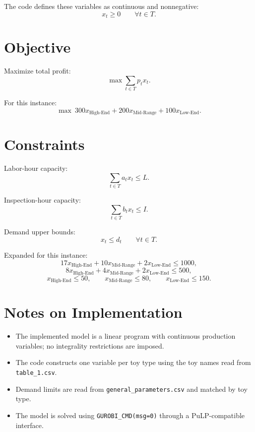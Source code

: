 The code defines these variables as continuous and nonnegative:
\[
x_t \ge 0 \qquad \forall t \in T.
\]

\section*{Objective}

Maximize total profit:
\[
\max \sum_{t \in T} p_t x_t.
\]

For this instance:
\[
\max\ 300x_{\text{High-End}} + 200x_{\text{Mid-Range}} + 100x_{\text{Low-End}}.
\]

\section*{Constraints}

Labor-hour capacity:
\[
\sum_{t \in T} a_t x_t \le L.
\]

Inspection-hour capacity:
\[
\sum_{t \in T} b_t x_t \le I.
\]

Demand upper bounds:
\[
x_t \le d_t \qquad \forall t \in T.
\]

Expanded for this instance:
\[
17x_{\text{High-End}} + 10x_{\text{Mid-Range}} + 2x_{\text{Low-End}} \le 1000,
\]
\[
8x_{\text{High-End}} + 4x_{\text{Mid-Range}} + 2x_{\text{Low-End}} \le 500,
\]
\[
x_{\text{High-End}} \le 50,\qquad
x_{\text{Mid-Range}} \le 80,\qquad
x_{\text{Low-End}} \le 150.
\]

\section*{Notes on Implementation}

\begin{itemize}
    \item The implemented model is a linear program with continuous production variables; no integrality restrictions are imposed.
    \item The code constructs one variable per toy type using the toy names read from \texttt{table\_1.csv}.
    \item Demand limits are read from \texttt{general\_parameters.csv} and matched by toy type.
    \item The model is solved using \texttt{GUROBI\_CMD(msg=0)} through a PuLP-compatible interface.
\end{itemize}
